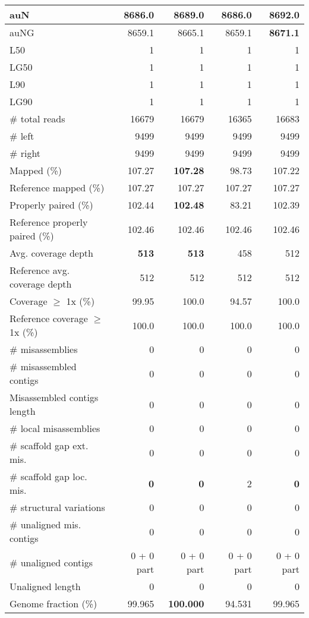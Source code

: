\documentclass[12pt,a4paper]{article}
\begin{document}
\begin{table}[ht]
\begin{center}
\begin{tabular}{|l*{4}{|r}|}
auN & 8686.0 & 8689.0 & 8686.0 & {\bf 8692.0} \\ \hline
auNG & 8659.1 & 8665.1 & 8659.1 & {\bf 8671.1} \\ \hline
L50 & 1 & 1 & 1 & 1 \\ \hline
LG50 & 1 & 1 & 1 & 1 \\ \hline
L90 & 1 & 1 & 1 & 1 \\ \hline
LG90 & 1 & 1 & 1 & 1 \\ \hline
\# total reads & 16679 & 16679 & 16365 & 16683 \\ \hline
\# left & 9499 & 9499 & 9499 & 9499 \\ \hline
\# right & 9499 & 9499 & 9499 & 9499 \\ \hline
Mapped (\%) & 107.27 & {\bf 107.28} & 98.73 & 107.22 \\ \hline
Reference mapped (\%) & 107.27 & 107.27 & 107.27 & 107.27 \\ \hline
Properly paired (\%) & 102.44 & {\bf 102.48} & 83.21 & 102.39 \\ \hline
Reference properly paired (\%) & 102.46 & 102.46 & 102.46 & 102.46 \\ \hline
Avg. coverage depth & {\bf 513} & {\bf 513} & 458 & 512 \\ \hline
Reference avg. coverage depth & 512 & 512 & 512 & 512 \\ \hline
Coverage $\geq$ 1x (\%) & 99.95 & 100.0 & 94.57 & 100.0 \\ \hline
Reference coverage $\geq$ 1x (\%) & 100.0 & 100.0 & 100.0 & 100.0 \\ \hline
\# misassemblies & 0 & 0 & 0 & 0 \\ \hline
\# misassembled contigs & 0 & 0 & 0 & 0 \\ \hline
Misassembled contigs length & 0 & 0 & 0 & 0 \\ \hline
\# local misassemblies & 0 & 0 & 0 & 0 \\ \hline
\# scaffold gap ext. mis. & 0 & 0 & 0 & 0 \\ \hline
\# scaffold gap loc. mis. & {\bf 0} & {\bf 0} & 2 & {\bf 0} \\ \hline
\# structural variations & 0 & 0 & 0 & 0 \\ \hline
\# unaligned mis. contigs & 0 & 0 & 0 & 0 \\ \hline
\# unaligned contigs & 0 + 0 part & 0 + 0 part & 0 + 0 part & 0 + 0 part \\ \hline
Unaligned length & 0 & 0 & 0 & 0 \\ \hline
Genome fraction (\%) & 99.965 & {\bf 100.000} & 94.531 & 99.965 \\ \hline

\end{tabular}
\end{center}
\end{table}
\end{document}
